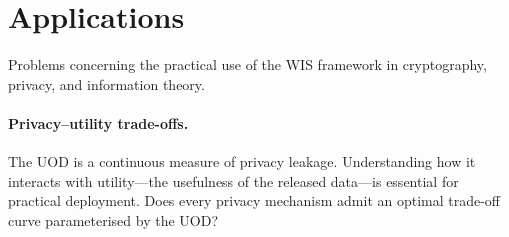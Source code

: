 \section*{Applications}

Problems concerning the practical use of the WIS framework in
cryptography, privacy, and information theory.

\paragraph{Privacy--utility trade-offs.}
The UOD is a continuous measure of privacy leakage.  Understanding how
it interacts with utility---the usefulness of the released data---is
essential for practical deployment.  Does every privacy mechanism
admit an optimal trade-off curve parameterised by the UOD?
